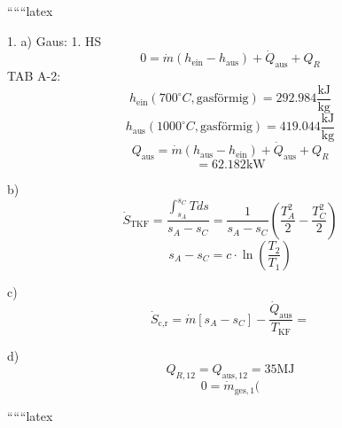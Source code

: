 
``````latex


1. a) Gaus: 1. HS
\[
0 = \dot{m}(h_{\text{ein}} - h_{\text{aus}}) + \dot{Q}_{\text{aus}} + Q_R
\]
TAB A-2:
\[
h_{\text{ein}} (700^\circ C, \text{gasförmig}) = 292.984 \frac{\text{kJ}}{\text{kg}}
\]
\[
h_{\text{aus}} (1000^\circ C, \text{gasförmig}) = 419.044 \frac{\text{kJ}}{\text{kg}}
\]
\[
Q_{\text{aus}} = \dot{m}(h_{\text{aus}} - h_{\text{ein}}) + \dot{Q}_{\text{aus}} + Q_R
\]
\[
= 62.182 \text{kW}
\]

b)
\[
\dot{S}_{\text{TKF}} = \frac{\int_{s_A}^{s_C} T ds}{s_A - s_C} = \frac{1}{s_A - s_C} \left( \frac{T_A^2}{2} - \frac{T_C^2}{2} \right)
\]
\[
s_A - s_C = c \cdot \ln \left( \frac{T_2}{T_1} \right)
\]

c)
\[
\dot{S}_{\text{c,r}} = \dot{m} [s_A - s_C] - \frac{\dot{Q}_{\text{aus}}}{T_{\text{KF}}} =
\]

d)
\[
Q_{R,12} = Q_{\text{aus},12} = 35 \text{MJ}
\]
\[
0 = \dot{m}_{\text{ges},1} (
\]

``````latex


